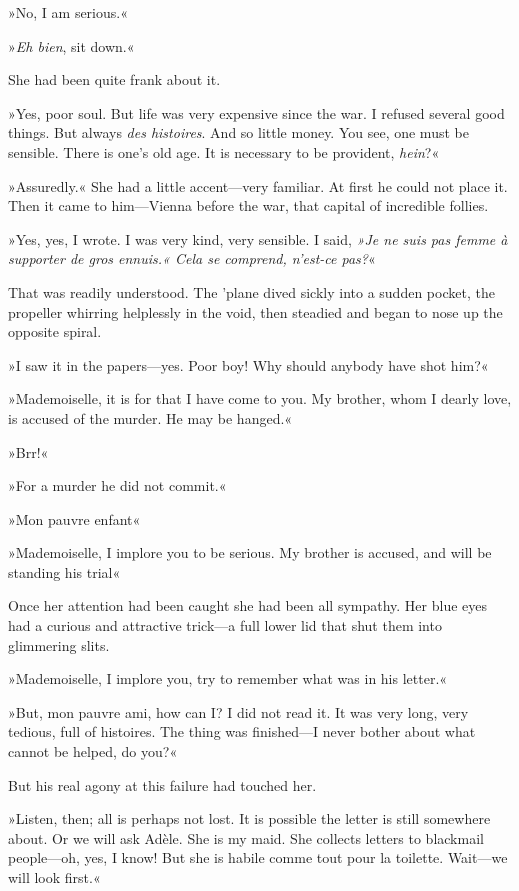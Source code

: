 »No, I am serious.«

»\textit{Eh bien}, sit down.«

She had been quite frank about it.

»Yes, poor soul. But life was very expensive since the war. I refused
several good things. But always \textit{des histoires}. And so little money.
You see, one must be sensible. There is one's old age. It is necessary
to be provident, \textit{hein}?«

»Assuredly.« She had a little accent—very familiar. At first he could
not place it. Then it came to him—Vienna before the war, that capital
of incredible follies.

»Yes, yes, I wrote. I was very kind, very sensible. I said, \foreignlanguage{french}{\textit{»Je ne suis pas femme à supporter de gros ennuis.« Cela se comprend, n'est-ce pas?}}«

That was readily understood. The 'plane dived sickly into a sudden pocket, the propeller whirring helplessly in the void, then steadied and began to nose up the opposite spiral.

»I saw it in the papers—yes. Poor boy! Why should anybody have shot him?«

»Mademoiselle, it is for that I have come to you. My brother, whom I dearly love, is accused of the murder. He may be hanged.«

»Brr!«

»For a murder he did not commit.«

»Mon pauvre enfant\longdash«

»Mademoiselle, I implore you to be serious. My brother is accused, and will be standing his trial\longdash«

Once her attention had been caught she had been all sympathy. Her blue eyes had a curious and attractive trick—a full lower lid that shut them into glimmering slits.

»Mademoiselle, I implore you, try to remember what was in his letter.«

»But, mon pauvre ami, how can I? I did not read it. It was very long, very tedious, full of histoires. The thing was finished—I never bother about what cannot be helped, do you?«

But his real agony at this failure had touched her.

»Listen, then; all is perhaps not lost. It is possible the letter is still somewhere about. Or we will ask Adèle. She is my maid. She collects letters to blackmail people—oh, yes, I know! But she is habile comme tout pour la toilette. Wait—we will look first.«

